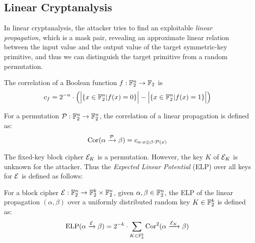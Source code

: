 \subsection{Linear Cryptanalysis}

In linear cryptanalysis, the attacker tries to find an exploitable \textit{linear propagation}, which is a mask pair, revealing an approximate linear relation between the input value and the output value of the target symmetric-key primitive, and thus we can distinguish the target primitive from a random permutation. 

\begin{definition}[Correlation]
    The correlation of a Boolean function $f:\mathbb{F}_2^n\rightarrow\mathbb{F}_2$ is
    \begin{align*}
        c_f=2^{-n}\cdot\Big(\Big| \{x\in\mathbb{F}_2^n|f(x)=0\} \Big|-\Big| \{x\in\mathbb{F}_2^n|f(x)=1\} \Big|\Big)
    \end{align*}
\end{definition}

\begin{definition}
    For a permutation $\mathcal{P}:\mathbb{F}_2^n\rightarrow \mathbb{F}_2^n$, the correlation of a linear propagation is defined as:
    \begin{align*}
        \text{Cor}(\alpha\xrightarrow{\mathcal{P}}\beta)=c_{\alpha\cdot x\oplus \beta\cdot\mathcal{P}(x)}
    \end{align*}
\end{definition}

The fixed-key block cipher $\mathcal{E}_K$ is a permutation. However, the key $K$ of $\mathcal{E}_K$ is unknown for the attacker. Thus the \textit{Expected Linear Potential} (ELP) over all keys for $\mathcal{E}$ is defined as follows:

\begin{definition}
    For a block cipher $\mathcal{E}:\mathbb{F}_2^n\rightarrow \mathbb{F}_2^k\times\mathbb{F}_2^n$, given $\alpha,\beta\in \mathbb{F}_2^n$, the ELP of the linear propagation $(\alpha,\beta)$ over a uniformly distributed random key $K\in \mathbb{F}_2^k$ is defined as:
    \begin{align*}
        \text{ELP}(\alpha\xrightarrow{\mathcal{E}}\beta)=2^{-k}\cdot\sum\limits_{K\in \mathbb{F}_2^k}\text{Cor}^2(\alpha\xrightarrow{\mathcal{E}_K}\beta)
    \end{align*}
\end{definition}

